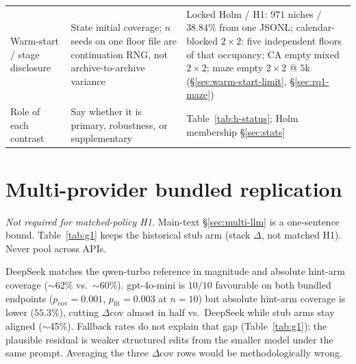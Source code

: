 \begin{table}[!htbp]
{\begin{tabular}{@{}p{3.4cm}p{5.0cm}p{5.4cm}@{}}
    Warm-start / stage disclosure & State initial coverage; $n$ seeds on one floor file are continuation RNG, not archive-to-archive variance & Locked Holm / H1: $971$ niches / $38.84\%$ from one JSONL; calendar-blocked $2\times2$: five independent floors of that occupancy; CA empty mixed $2\times2$; maze empty $2\times2$ @ $5$k (\S\ref{sec:warm-start-limit}, \S\ref{sec:rq1-maze}) \\
    Role of each contrast & Say whether it is primary, robustness, or supplementary & Table~\ref{tab:h-status}; Holm membership \S\ref{sec:stats} \\
    \bottomrule
  \end{tabular}%
  }
\end{table}

\section{Multi-provider bundled replication}
\label{sec:multi-provider-appendix}

\emph{Not required for matched-policy H1.} Main-text \S\ref{sec:multi-llm} is a one-sentence bound. Table~\ref{tab:g1} keeps the historical stub arm (stack $\Delta$, not matched H1). Never pool across APIs.

\begin{table}[!htbp]
  \centering
  \caption{Multi-provider bundled hints $-$ stub by LLM (separate experiments; never pooled). Absolute hint-arm coverage shows level gaps across APIs.}
  \label{tab:g1}
\end{table}

DeepSeek matches the qwen-turbo reference in magnitude and absolute hint-arm coverage ($\sim$62\% vs.\ $\sim$60\%). gpt-4o-mini is $10/10$ favourable on both bundled endpoints ($p_{\mathrm{cov}}{=}0.001$, $p_{\mathrm{fit}}{=}0.003$ at $n{=}10$) but absolute hint-arm coverage is lower ($55.3\%$), cutting $\Delta$cov almost in half vs.\ DeepSeek while stub arms stay aligned ($\sim$45\%). Fallback rates do not explain that gap (Table~\ref{tab:g1}); the plausible residual is weaker structured edits from the smaller model under the same prompt. Averaging the three $\Delta$cov rows would be methodologically wrong.

